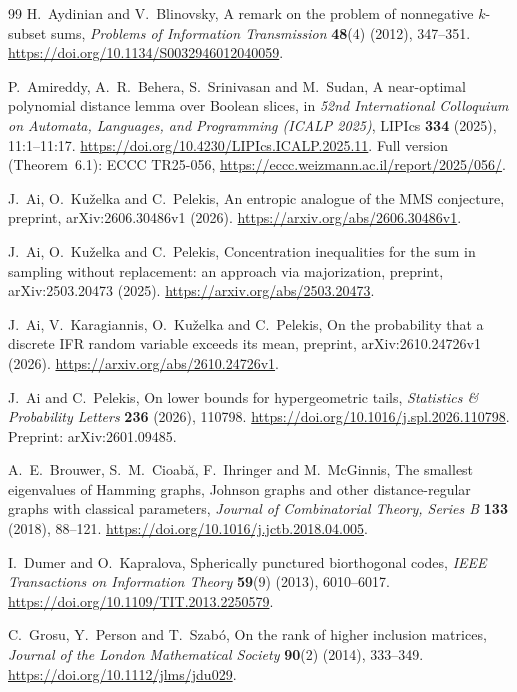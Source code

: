 \documentclass[11pt]{article}
\theoremstyle{remark}
\begin{document}
\begin{thebibliography}{99}
H.~Aydinian and V.~Blinovsky,
A remark on the problem of nonnegative \(k\)-subset sums,
\emph{Problems of Information Transmission} \textbf{48}(4) (2012), 347--351.
\url{https://doi.org/10.1134/S0032946012040059}.

P.~Amireddy, A.~R.~Behera, S.~Srinivasan and M.~Sudan,
A near-optimal polynomial distance lemma over Boolean slices,
in \emph{52nd International Colloquium on Automata, Languages, and
Programming (ICALP 2025)}, LIPIcs \textbf{334} (2025), 11:1--11:17.
\url{https://doi.org/10.4230/LIPIcs.ICALP.2025.11}.
Full version (Theorem~6.1): ECCC TR25-056,
\url{https://eccc.weizmann.ac.il/report/2025/056/}.

J.~Ai, O.~Ku\v{z}elka and C.~Pelekis,
An entropic analogue of the MMS conjecture,
preprint, arXiv:2606.30486v1 (2026).
\url{https://arxiv.org/abs/2606.30486v1}.

J.~Ai, O.~Ku\v{z}elka and C.~Pelekis,
Concentration inequalities for the sum in sampling without replacement: an
approach via majorization,
preprint, arXiv:2503.20473 (2025).
\url{https://arxiv.org/abs/2503.20473}.

J.~Ai, V.~Karagiannis, O.~Ku\v{z}elka and C.~Pelekis,
On the probability that a discrete IFR random variable exceeds its mean,
preprint, arXiv:2610.24726v1 (2026).
\url{https://arxiv.org/abs/2610.24726v1}.

J.~Ai and C.~Pelekis,
On lower bounds for hypergeometric tails,
\emph{Statistics \& Probability Letters} \textbf{236} (2026), 110798.
\url{https://doi.org/10.1016/j.spl.2026.110798}.
Preprint: arXiv:2601.09485.

A.~E.~Brouwer, S.~M.~Cioab\u{a}, F.~Ihringer and M.~McGinnis,
The smallest eigenvalues of Hamming graphs, Johnson graphs and
other distance-regular graphs with classical parameters,
\emph{Journal of Combinatorial Theory, Series B} \textbf{133} (2018), 88--121.
\url{https://doi.org/10.1016/j.jctb.2018.04.005}.

I.~Dumer and O.~Kapralova,
Spherically punctured biorthogonal codes,
\emph{IEEE Transactions on Information Theory} \textbf{59}(9) (2013),
6010--6017.
\url{https://doi.org/10.1109/TIT.2013.2250579}.

C.~Grosu, Y.~Person and T.~Szab\'o,
On the rank of higher inclusion matrices,
\emph{Journal of the London Mathematical Society} \textbf{90}(2) (2014), 333--349.
\url{https://doi.org/10.1112/jlms/jdu029}.


\end{thebibliography}
\end{document}
